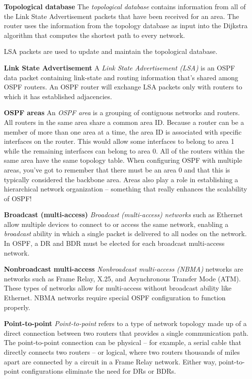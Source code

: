\textbf{Topological database} The \emph{topological database} contains
information from all of the Link State Advertisement packets that have
been received for an area. The router uses the information from the
topology database as input into the Dijkstra algorithm that computes the
shortest path to every network.

\begin{note}
LSA packets are used to update and maintain the topological database.
\end{note}

\textbf{Link State Advertisement} A \emph{Link State Advertisement
(LSA)} is an OSPF data packet containing link-state and routing
information that's shared among OSPF routers. An OSPF router will
exchange LSA packets only with routers to which it has established
adjacencies.

\textbf{OSPF areas} An \emph{OSPF area} is a grouping of contiguous
networks and routers. All routers in the same area share a common area
ID. Because a router can be a member of more than one area at a time,
the area ID is associated with specific interfaces on the router. This
would allow some interfaces to belong to area 1 while the remaining
interfaces can belong to area 0. All of the routers within the same area
have the same topology table. When configuring OSPF with multiple areas,
you've got to remember that there must be an area 0 and that this is
typically considered the backbone area. Areas also play a role in
establishing a hierarchical network organization -- something that really
enhances the scalability of OSPF!

\textbf{Broadcast (multi-access)} \emph{Broadcast (multi-access)
networks} such as Ethernet allow multiple devices to connect to or
access the same network, enabling a \emph{broadcast} ability in which a
single packet is delivered to all nodes on the network. In OSPF, a DR
and BDR must be elected for each broadcast multi-access network.

\textbf{Nonbroadcast multi-access} \emph{Nonbroadcast multi-access
(NBMA)} networks are networks such as Frame Relay, X.25, and
Asynchronous Transfer Mode (ATM). These types of networks allow for
multi-access without broadcast ability like Ethernet. NBMA networks
require special OSPF configuration to function properly.

\protect\hypertarget{c18.xhtmlux5cux23Page_751}{}{}\textbf{Point-to-point}
\emph{Point-to-point} refers to a type of network topology made up of a
direct connection between two routers that provides a single
communication path. The point-to-point connection can be physical -- for
example, a serial cable that directly connects two routers -- or logical,
where two routers thousands of miles apart are connected by a circuit in
a Frame Relay network. Either way, point-to-point configurations
eliminate the need for DRs or BDRs.

